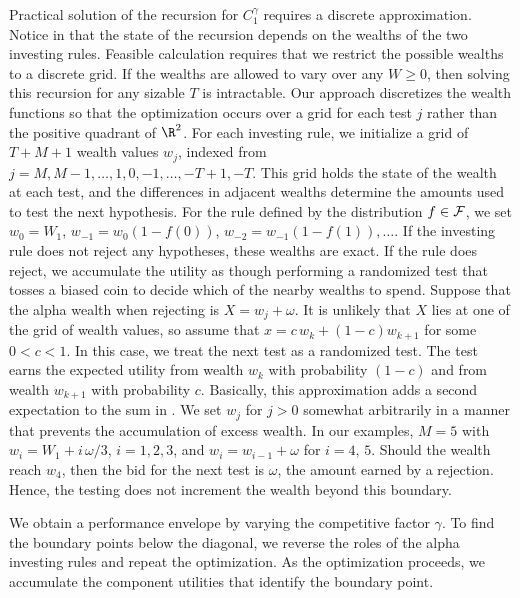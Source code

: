 \documentclass[12pt]{article}
\begin{document}
 Practical solution of the recursion for $C_1^\gamma$ requires a discrete
 approximation.  Notice in  that the state of the recursion depends
 on the wealths of the two investing rules. Feasible calculation requires that
 we restrict the possible wealths to a discrete grid.  If the wealths are
 allowed to vary over any $W \ge 0$, then solving this recursion for any sizable
 $T$ is intractable.  Our approach discretizes the wealth functions so that the
 optimization occurs over a grid for each test $j$ rather than the positive
 quadrant of $\R^2$.  For each investing rule, we initialize a grid of $T+M+1$
 wealth values $w_j$, indexed from $j=M, M-1, \ldots, 1, 0, -1, \ldots, -T+1,
 -T$.  This grid holds the state of the wealth at each test, and the differences
 in adjacent wealths determine the amounts used to test the next hypothesis.
  For the rule defined by the distribution $f \in {\cal F}$, we set $w_0 = W_1$,
 $w_{-1} = w_0(1-f(0))$, $w_{-2} = w_{-1}(1-f(1)), \ldots$.  If the investing
 rule does not reject any hypotheses, these wealths are exact.  If the rule does
 reject, we accumulate the utility as though performing a randomized test that
 tosses a biased coin to decide which of the nearby wealths to spend.  Suppose
 that the alpha wealth when rejecting is $X = w_j + \omega$.  It is unlikely
 that $X$ lies at one of the grid of wealth values, so assume that $x = c \, w_k
 + (1-c) w_{k+1}$ for some $0 < c < 1$.  In this case, we treat the next test as
 a randomized test.  The test earns the expected utility from wealth $w_k$ with
 probability $(1-c)$ and from wealth $w_{k+1}$ with probability $c$. Basically,
 this approximation adds a second expectation to the sum in . We
 set $w_j$ for $j > 0$ somewhat arbitrarily in a manner that prevents the
 accumulation of excess wealth.  In our examples, $M=5$ with $w_i = W_1 + i
 \,\omega/3$, $i=1,2,3$, and $w_i = w_{i-1} + \omega$ for $i=4,\,5$.  Should the
 wealth reach $w_4$, then the bid for the next test is $\omega$, the amount
 earned by a rejection.  Hence, the testing does not increment the wealth beyond
 this boundary.
 

 We obtain a performance envelope by varying the competitive factor $\gamma$.
  To find the boundary points below the diagonal, we reverse the roles of the
 alpha investing rules and repeat the optimization.  As the optimization
 proceeds, we accumulate the component utilities that identify the boundary
 point.



\end{document}
